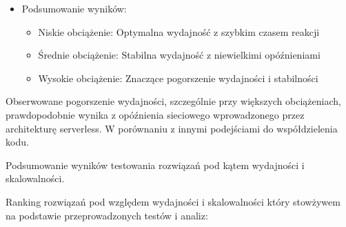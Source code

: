 \documentclass[runningheads,12pt]{llncs}
\begin{document}
\begin{itemize}
  \item Podsumowanie wyników:
  \begin{itemize}
    \item Niskie obciążenie: Optymalna wydajność z szybkim czasem reakcji
    \item Średnie obciążenie: Stabilna wydajność z niewielkimi opóźnieniami
    \item Wysokie obciążenie: Znaczące pogorszenie wydajności i stabilności
  \end{itemize}
\end{itemize}

Obserwowane pogorszenie wydajności, szczególnie przy większych obciążeniach, prawdopodobnie wynika z opóźnienia sieciowego wprowadzonego przez architekturę serverless. W porównaniu z innymi podejściami do współdzielenia kodu.

\newpage


Podsumowanie wyników testowania rozwiązań pod kątem wydajności i skalowalności.

Ranking rozwiązań pod względem wydajności i skalowalności który stowżywem na podstawie przeprowadzonych testów i analiz:
\end{document}
